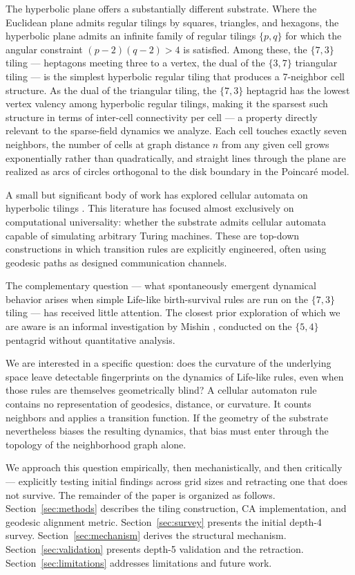\documentclass[12pt,a4paper]{article}
\begin{document}
The hyperbolic plane offers a substantially different substrate. Where the Euclidean plane admits regular tilings by squares, triangles, and hexagons, the hyperbolic plane admits an infinite family of regular tilings $\{p,q\}$ for which the angular constraint $(p-2)(q-2)>4$ is satisfied. Among these, the $\{7,3\}$ tiling --- heptagons meeting three to a vertex, the dual of the $\{3,7\}$ triangular tiling --- is the simplest hyperbolic regular tiling that produces a 7-neighbor cell structure. As the dual of the triangular tiling, the $\{7,3\}$ heptagrid has the lowest vertex valency among hyperbolic regular tilings, making it the sparsest such structure in terms of inter-cell connectivity per cell --- a property directly relevant to the sparse-field dynamics we analyze. Each cell touches exactly seven neighbors, the number of cells at graph distance $n$ from any given cell grows exponentially rather than quadratically, and straight lines through the plane are realized as arcs of circles orthogonal to the disk boundary in the Poincar\'{e} model.

A small but significant body of work has explored cellular automata on hyperbolic tilings \cite{Margenstern2000,Margenstern2007}. This literature has focused almost exclusively on computational universality: whether the substrate admits cellular automata capable of simulating arbitrary Turing machines. These are top-down constructions in which transition rules are explicitly engineered, often using geodesic paths as designed communication channels.

The complementary question --- what spontaneously emergent dynamical behavior arises when simple Life-like birth-survival rules are run on the $\{7,3\}$ tiling --- has received little attention. The closest prior exploration of which we are aware is an informal investigation by Mishin \cite{Mishin2011}, conducted on the $\{5,4\}$ pentagrid without quantitative analysis.

We are interested in a specific question: does the curvature of the underlying space leave detectable fingerprints on the dynamics of Life-like rules, even when those rules are themselves geometrically blind? A cellular automaton rule contains no representation of geodesics, distance, or curvature. It counts neighbors and applies a transition function. If the geometry of the substrate nevertheless biases the resulting dynamics, that bias must enter through the topology of the neighborhood graph alone.

We approach this question empirically, then mechanistically, and then critically --- explicitly testing initial findings across grid sizes and retracting one that does not survive. The remainder of the paper is organized as follows. Section~\ref{sec:methods} describes the tiling construction, CA implementation, and geodesic alignment metric. Section~\ref{sec:survey} presents the initial depth-4 survey. Section~\ref{sec:mechanism} derives the structural mechanism. Section~\ref{sec:validation} presents depth-5 validation and the retraction. Section~\ref{sec:limitations} addresses limitations and future work.
\end{document}
